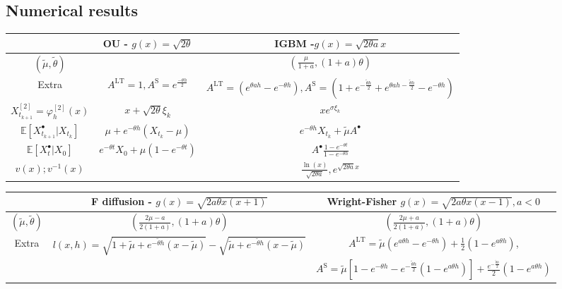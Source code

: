 \documentclass[a4paper,12pt]{article}
\numberwithin{equation}{section}
\theoremstyle{plain}
\theoremstyle{definition}
\begin{document}
\begin{appendix}
\section{Numerical results}\label{AppendixC}
\begin{table}
\tiny
    \centering
        \begin{tabular}{ccc}
        \toprule
             & {\bf OU} - $g(x)=\sqrt{2\theta }$ & {\bf IGBM} -$g(x)=\sqrt{2\theta a}x$ \\\midrule
        $(\tilde\mu,\tilde\theta)$& &$\left(\frac{\mu}{1+a},(1+a)\theta\right)$\\ \midrule
        Extra& $A^{\textrm{LT}}=1,A^{\textrm{S}}=e^{\frac{-\theta h}{2}}$&$A^{\textrm{LT}}=(e^{\theta ah}-e^{-\theta h}), A^{\mathrm{S}}=\left(1+e^{-\frac{\tilde\theta h}{2}}+e^{\theta ah-\frac{\tilde\theta h}{2}}-e^{-\theta h}\right)$\\ \midrule
        $X^{[2]}_{t_{k+1}}=\varphi^{[2]}_h(x)$&  $x+\sqrt{2\theta}\xi_k$&$xe^{\sigma \xi_k}$\\ \midrule
        $\mathbb{E}[X^{\bullet}_{t_{k+1}}|X_{t_k}]$&$\mu+e^{-\theta h}(X_{t_k}-\mu)$&$e^{-\theta h}X_{t_k}+\tilde\mu A^\bullet$\\ \midrule
        $\mathbb{E}[X^\bullet_{t}|X_0]$&$e^{-\theta t}X_0+\mu(1-e^{-\theta t})$&$A^{\bullet}\frac{1-e^{-\theta t}}{1-e^{-\theta h}}$\\ \midrule
        $v(x);v^{-1}(x)$&&$\frac{\ln(x)}{\sqrt{2\theta a}},e^{\sqrt{2\theta a}x}$\\ 
        \bottomrule
        \end{tabular}
    \vspace{.5cm}
        \begin{tabular}{ccc}
        \toprule
    & {\bf F diffusion} - $g(x)=\sqrt{2a\theta x(x+1)}$ & {\bf Wright-Fisher} $g(x)=\sqrt{2a\theta x(x-1)}, a<0$ \\ \midrule
    $(\tilde\mu,\tilde\theta)$ & $(\frac{2\mu-a}{2(1+a)},(1+a)\theta)$& $(\frac{2\mu+a}{2(1+a)},(1+a)\theta)$\\ \midrule
    Extra&$l(x,h)=\sqrt{1+\tilde{\mu}+e^{-\tilde{\theta}h}\left(x-\tilde{\mu}\right)}-\sqrt{\tilde{\mu}+e^{-\tilde{\theta}h}\left(x-\tilde{\mu}\right)}$& $A^{\textrm{LT}}=\tilde{\mu}\left(e^{a\theta h}-e^{-\theta h}\right)+\frac{1}{2}\left(1-e^{a\theta h}\right)$,\\
&&{$A^{\textrm{S}}=\tilde{\mu}\left[1-e^{-\theta h}-e^{-\frac{\tilde{\theta}h}{2}}(1-e^{a\theta h})\right]+\frac{e^{-\frac{\tilde{\theta}h}{2}}}{2}
\left(1-e^{a\theta h}\right)$}\\ \midrule

\end{tabular}
\end{table}
\end{appendix}
\end{document}
